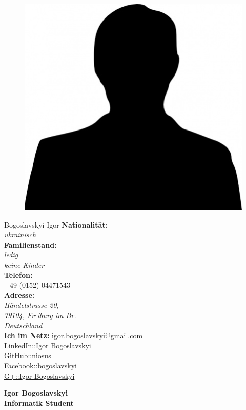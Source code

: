 \documentclass[a4paper,12pt,final]{memoir}
\newcommand{\SmallSep}{\vspace{0.5em}}
\begin{document}
\begin{figure}
	\hfill
	\includegraphics[width=0.6\columnwidth]{photo.jpg}
	\vspace{-4cm}
\end{figure}
\begin{flushright}\small
	Bogoslavskyi Igor
	\textbf{Nationalit\"{a}t:} \emph{\\ukrainisch\\}
	\textbf{Familienstand:} \emph{\\ledig \\keine Kinder\\}
	\SmallSep
	\textbf{Telefon:}\\
	+49 (0152) 04471543\\
	\textbf{Adresse:}\\ \emph{H\"{a}ndelstrasse 20, \\79104, Freiburg im Br. \\Deutschland}\\
	\SmallSep
	\textbf{Ich im Netz:}
	\href{mailto:igor.bogoslavskyi@gmail.com}{igor.bogoslavskyi@gmail.com}\\ 
	\SmallSep
	\href{http://www.linkedin.com/pub/igor-bogoslavskyi/43/50b/726}{LinkedIn::Igor Bogoslavskyi}\\ 
	\SmallSep
	\href{https://github.com/niosus}{GitHub::niosus}\\
	\SmallSep
	\href{https://www.facebook.com/bogoslavskyi}{Facebook::bogoslavskyi}\\ 
	\SmallSep
	\href{https://plus.google.com/118159072920638602239/posts}{G+::Igor Bogoslavskyi}\\ 
	\SmallSep
\end{flushright}\normalsize
\framebreak


\Huge\bfseries {\color{MidnightBlue} Igor Bogoslavskyi} \\
\Large\bfseries  Informatik Student \\
\end{document}
